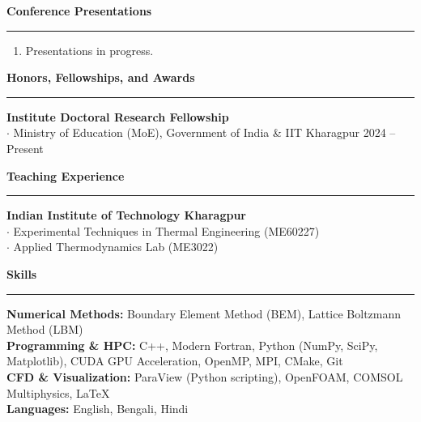 \documentclass[10pt,letterpaper]{article}
\begin{document}
\medskip

\noindent\textbf{\large Conference Presentations}
\vspace{2pt}
\hrule
\vspace{4pt}
\begin{enumerate}[leftmargin=1.8em, itemsep=2pt]
\item Presentations in progress.
\end{enumerate}

\medskip

\noindent\textbf{\large Honors, Fellowships, and Awards}
\vspace{2pt}
\hrule
\vspace{4pt}
\noindent\textbf{Institute Doctoral Research Fellowship}\\
\hspace*{1em}$\cdot$ Ministry of Education (MoE), Government of India \& IIT Kharagpur \hfill 2024 -- Present

\medskip

\noindent\textbf{\large Teaching Experience}
\vspace{2pt}
\hrule
\vspace{4pt}
\noindent\textbf{Indian Institute of Technology Kharagpur}\\
\hspace*{1em}$\cdot$ Experimental Techniques in Thermal Engineering (ME60227)\\
\hspace*{1em}$\cdot$ Applied Thermodynamics Lab (ME3022)

\medskip

\noindent\textbf{\large Skills}
\vspace{2pt}
\hrule
\vspace{4pt}
\noindent\textbf{Numerical Methods:} Boundary Element Method (BEM), Lattice Boltzmann Method (LBM)\\[2pt]
\noindent\textbf{Programming \& HPC:} C++, Modern Fortran, Python (NumPy, SciPy, Matplotlib), CUDA GPU Acceleration, OpenMP, MPI, CMake, Git\\[2pt]
\noindent\textbf{CFD \& Visualization:} ParaView (Python scripting), OpenFOAM, COMSOL Multiphysics, \LaTeX\\[2pt]
\noindent\textbf{Languages:} English, Bengali, Hindi

\medskip
\end{document}
